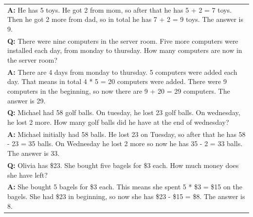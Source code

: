 \documentclass{article} %
\begin{document}
\begin{table}[h]
\begin{tabular}{p{13.5cm}}
        \vspace{-1mm}
        \textbf{A:} He has 5 toys. He got 2 from mom, so after that he has 5 + 2 = 7 toys. Then he got 2 more from dad, so in total he has 7 + 2 = 9 toys. The answer is 9. \\
        \vspace{0mm}
        \textbf{Q:} There were nine computers in the server room. Five more computers were installed each day, from monday to thursday. How many computers are now in the server room? \\
        \vspace{-1mm}
        \textbf{A:} There are 4 days from monday to thursday. 5 computers were added each day. That means in total 4 * 5 = 20 computers were added. There were 9 computers in the beginning, so now there are 9 + 20 = 29 computers. The answer is 29. \\
        \vspace{0mm}
        \textbf{Q:} Michael had 58 golf balls. On tuesday, he lost 23 golf balls. On wednesday, he lost 2 more. How many golf balls did he have at the end of wednesday? \\
        \vspace{-1mm}
        \textbf{A:} Michael initially had 58 balls. He lost 23 on Tuesday, so after that he has 58 - 23 = 35 balls. On Wednesday he lost 2 more so now he has 35 - 2 = 33 balls. The answer is 33.\ \\
        \vspace{0mm}
        \textbf{Q:} Olivia has \$23. She bought five bagels for \$3 each. How much money does she have left? \\
        \vspace{-1mm}
        \textbf{A:} She bought 5 bagels for \$3 each. This means she spent 5 * \$3 = \$15 on the bagels. She had \$23 in beginning, so now she has \$23 - \$15 = \$8. The answer is 8. \\
        \bottomrule
    \end{tabular}
    \label{tab:prompt-math}
\end{table}
\end{document}
